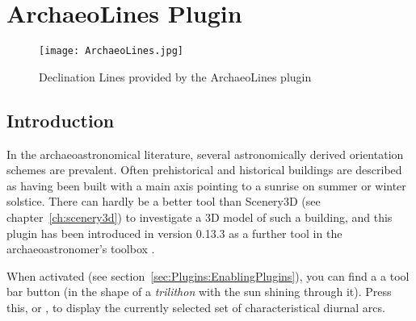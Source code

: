 

% 
% 
% 
\newpage
\section{ArchaeoLines Plugin}
\label{sec:plugin:ArchaeoLines}
\begin{figure}[ht]
\texttt{[image: ArchaeoLines.jpg]}
\caption{Declination Lines provided by the ArchaeoLines plugin}
\label{fig:plugin:ArchaeoLines}
\end{figure}


\subsection{Introduction}
\label{sec:plugin:ArchaeoLines:Introduction}

In the archaeoastronomical literature, several astronomically derived
orientation schemes are prevalent. Often prehistorical and historical
buildings are described as having been built with a main axis pointing
to a sunrise on summer or winter solstice. There can hardly be a
better tool than Scenery3D (see chapter~\ref{ch:scenery3d}) to
investigate a 3D model of such a building, and this plugin has been
introduced in version 0.13.3 as a further tool in the
archaeoastronomer's toolbox \citep{Zotti:SEAC2015}.

When activated (see section~\ref{sec:Plugins:EnablingPlugins}), you
can find a a tool bar button  (in the
shape of a \emph{trilithon} with the sun shining through it). Press
this, or , to display the currently selected set of
characteristical diurnal arcs.

